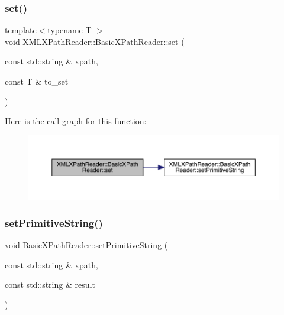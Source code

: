 \subsubsection{\texorpdfstring{set()}{set()}\hspace{0.1cm}{\footnotesize\ttfamily [3/3]}}
{\footnotesize\ttfamily template$<$typename T $>$ \\
void X\+M\+L\+X\+Path\+Reader\+::\+Basic\+X\+Path\+Reader\+::set (\begin{DoxyParamCaption}\item[{const std\+::string \&}]{xpath,  }\item[{const T \&}]{to\+\_\+set }\end{DoxyParamCaption})\hspace{0.3cm}{\ttfamily [inline]}}

Here is the call graph for this function\+:
\nopagebreak
\begin{figure}[H]
\begin{center}
\leavevmode
\includegraphics[width=350pt]{d6/dbf/classXMLXPathReader_1_1BasicXPathReader_a4cf7407f107bf4f307b70af4cccbd30e_cgraph}
\end{center}
\end{figure}
\mbox{\label{classXMLXPathReader_1_1BasicXPathReader_a1cc6aa3e855c995ebd874c475a68a076}} 
\subsubsection{\texorpdfstring{setPrimitiveString()}{setPrimitiveString()}\hspace{0.1cm}{\footnotesize\ttfamily [1/3]}}
{\footnotesize\ttfamily void Basic\+X\+Path\+Reader\+::set\+Primitive\+String (\begin{DoxyParamCaption}\item[{const std\+::string \&}]{xpath,  }\item[{const std\+::string \&}]{result }\end{DoxyParamCaption})}

